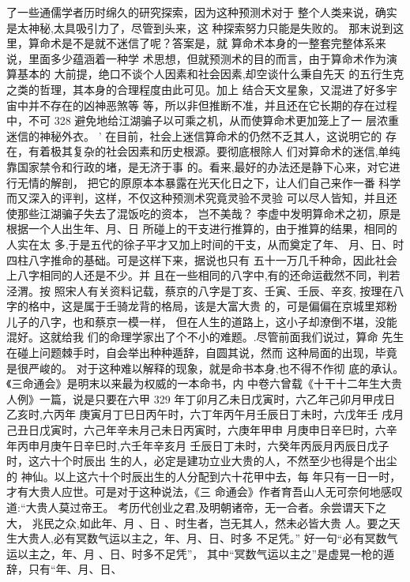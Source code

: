了一些通儒学者历时绵久的研究探索，因为这种预测术对于
整个人类来说，确实是太神秘,太具吸引力了，尽管到头来，这
种探索努力只能是失败的。
那末说到这里，算命术是不是就不迷信了呢？答案是，就
算命术本身的一整套完整体系来说，里面多少蕴涵着一种学
术思想，但就预测术的目的而言，由于算命术作为演算基本的
大前提，绝口不谈个人因素和社会因素,却空谈什么秉自先天
的五行生克之类的哲理，其本身的合理程度由此可见。加上
结合天文星象，又混进了好多宇宙中并不存在的凶神恶煞等
等，所以非但推断不准，并且还在它长期的存在过程中，不可
328 
避免地给江湖骗子以可乘之机，从而使算命术更加笼上了一
层浓重迷信的神秘外衣。 ’
在目前，社会上迷信算命术的仍然不乏其人，这说明它的
存在，有着极其复杂的社会因素和历史根源。要彻底根除人
们对算命术的迷信,单纯靠国家禁令和行政的堵，是无济于事
的。看来,最好的办法还是静下心来，对它进行无情的解剖，
把它的原原本本暴露在光天化日之下，让人们自己来作一番
科学而又深入的评判，这样，不仅这种预测术究竟灵验不灵验
可以尽人皆知，并且还使那些江湖骗子失去了混饭吃的资本，
岂不美哉？
李虚中发明算命术之初，原是根据一个人出生年、月、日
所碰上的干支进行推算的，由于推算的结果，相同的人实在太
多,于是五代的徐子平才又加上时间的干支，从而奠定了年、
月、日、时四柱八字推命的基础。可是这样下来，据说也只有
五十一万几千种命，因此社会上八字相同的人还是不少。并
且在一些相同的八字中,有的还命运截然不同，判若泾渭。按
照宋人有关资料记载，蔡京的八字是丁亥、壬寅、壬辰、辛亥,
按理在八字的格中，这是属于壬骑龙背的格局，该是大富大贵
的，可是偏偏在京城里郑粉儿子的八字，也和蔡京一模一样，
但在人生的道路上，这小子却潦倒不堪，没能混好。这就给我
们的命理学家出了个不小的难题。.尽管前面我们说过，算命
先生在碰上问题棘手时，自会举出种种遁辞，自圆其说，然而
这种局面的出现，毕竟是很严峻的。
对于这种难以解释的现象，就是命书本身,也不得不作彻
底的承认。《三命通会》是明末以来最为权威的一本命书，内
中卷六曾载《十干十二年生大贵人例》一篇，说是只要在六甲
 329 
年丁卯月乙未日戊寅时，六乙年己卯月甲戌日乙亥时,六丙年
庚寅月丁巳日丙午时，六丁年丙午月壬辰日丁未时，六戊年壬
戌月己丑日戊寅时，六己年辛未月己未日丙寅时，六庚年甲申
月庚申日辛巳时，六辛年丙申月庚午日辛巳时,六壬年辛亥月
壬辰日丁未时，六癸年丙辰月丙辰日戊子时，这六十个时辰出
生的人，必定是建功立业大贵的人，不然至少也得是个出尘的
神仙。以上这六十个时辰出生的人分配到六十花甲中去，每
年只有一日一时，才有大贵人应世。可是对于这种说法，《三
命通会》作者育吾山人无可奈何地感叹道:“大贵人莫过帝王。
考历代创业之君,及明朝诸帝，无一合者。余尝谓天下之大，
兆民之众,如此年、月 、日 、时生者，岂无其人，然未必皆大贵
人。要之天生大贵人,必有冥数气运以主之，年、月、日、时多
不足凭。”
好一句“必有冥数气运以主之，年、月 、日、时多不足凭”，
其中“冥数气运以主之”是虚晃一枪的遁辞，只有“年、月、日、
